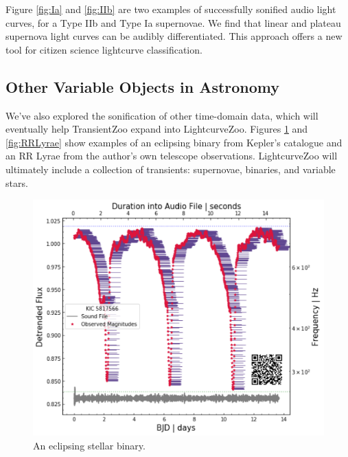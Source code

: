 \documentclass[]{acmsiggraph}
\begin{document}
Figure \ref{fig:Ia} and \ref{fig:IIb} are two examples of successfully sonified audio light curves, for a Type IIb and Type Ia supernovae. We find that linear and plateau supernova light curves can be audibly differentiated. This approach offers a new tool for citizen science lightcurve classification.


\subsection{Other Variable Objects in Astronomy}

We’ve also explored the sonification of other time-domain data, which will eventually help TransientZoo expand into LightcurveZoo. Figures \ref{fig:EB} and \ref{fig:RRLyrae} show examples of an eclipsing binary from Kepler’s catalogue and an RR Lyrae from the author's own telescope observations. LightcurveZoo will ultimately include a collection of transients: supernovae, binaries, and variable stars.

\begin{figure}
\centering
\includegraphics[width=.7\linewidth]{paper/images/EB.png}
\caption{An eclipsing stellar binary.}
\label{fig:EB}
\end{figure}
\end{document}
